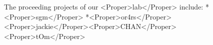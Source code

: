The proceeding projects of our <Proper>lab</Proper> include:
   *<Proper>sgm</Proper>
   *<Proper>or4rs</Proper>
<Proper>jackie</Proper><Proper>CHAN</Proper>
<Proper>tOm</Proper>
